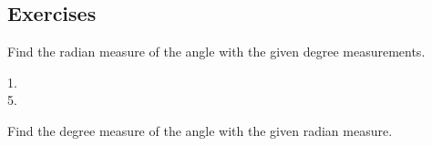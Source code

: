 \subsection{Exercises}
Find the radian measure of the angle with the given degree measurements. 

\begin{description}
\item [1.]   
\columnsep =30pt
 

\item [5.]
\columnsep =30pt
 \end{description}

Find the degree measure of the angle with the given radian measure. 


